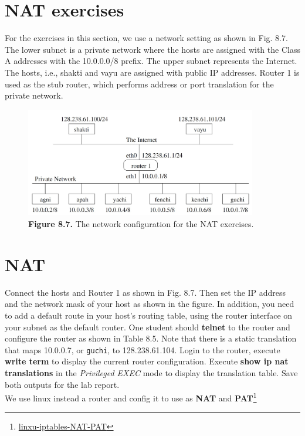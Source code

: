 \documentclass[10pt,a4paper]{article}
\numberwithin{equation}{section}
\numberwithin{figure}{section}
\numberwithin{table}{section}
\begin{document}
\section*{NAT exercises}
    For the exercises in this section, we use a network setting as shown in Fig. 8.7. The lower subnet is a private network where the hosts are assigned with the Class A addresses with the 10.0.0.0/8 prefix. The upper subnet represents the Internet. The hosts, i.e., shakti and vayu are assigned with public IP addresses. Router 1 is used as the stub router, which performs address or port translation for the private network.
    \begin{figure}[H]
        \centering
        \includegraphics[width=0.9\textwidth]{img/fig1.png}
        \caption{\textbf{Figure 8.7.} The network configuration for the NAT exercises.}
        \label{fig:8.7}
    \end{figure}

\section{NAT}
    Connect the hosts and Router 1 as shown in Fig.
    8.7. Then set the IP address and the network mask of your host as shown in the figure.
    In addition, you need to add a default route in your host’s routing table, using the router interface on your subnet as the default router.
    One student should \textbf{telnet} to the router and configure the router as shown in Table 8.5. Note that there is a static translation that maps 10.0.0.7, or \texttt{guchi}, to 128.238.61.104.
    Login to the router, execute \textbf{write term} to display the current router configuration.
    Execute \textbf{show ip nat translations} in the \textit{Privileged EXEC} mode to display the translation table.
    Save both outputs for the lab report.\\
    We use linux instead a router and config it to use as \textbf{NAT} and \textbf{PAT}\footnote{\href{http://www.solutionsatexperts.com/iptables-nat-pat/}{linxu-iptables-NAT-PAT}}
\end{document}
